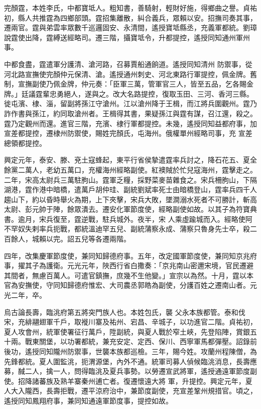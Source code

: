 \begin{pinyinscope}
 完顏霆，本姓李氏，中都寶坻人。粗知書，善騎射，輕財好施，得鄉曲之譽。貞祐初，縣人共推霆為四鄉部頭。霆招集離散，糾合義兵，眾賴以安。招撫司奏其事，遷兩官。霆與弟雲率眾數千巡邏固安、永清間，遙授寶坻縣丞，充義軍都統。劉璋說霆使出降，霆縛送經略司。遷三階，攝寶坻令，升都提控，遙授同知通州軍州事。



 中都食盡，霆遣軍分護清、滄河路，召募賈船通餉道。遙授同知清州
 防禦事，從河北路宣撫使完顏仲元保清、滄。遙授通州刺史、河北東路行軍提控，佩金牌。舊制，宣撫副使乃佩金牌，仲元奏：「臣軍三萬，管軍官三人，皆至五品，乞各賜金牌。」廷議霆輩忠勇絕人，遂與之。改大名路提控，復取玉田、三河、香河三縣。徙屯濱、棣、淄，留副將孫江守滄州。江以滄州降于王楫，而江將兵圍觀州。霆乃詐作書與孫江，約同取滄州者。王楫得其書，果疑孫江與霆有謀，召江還，殺之。霆乃定觀州而還。進官三階，充濱、棣行軍都提控。未幾，遙授同知益都府事，加宣差都提控，遷棣州防禦使，賜姓完顏氏，屯海州。俄權單州經略司事，充
 宣差總領都提控。



 興定元年，泰安、滕、兗土寇蜂起，東平行省侯摯遣霆率兵討之，降石花五、夏全餘黨二萬人，老幼五萬口，充權海州經略副使。紅襖賊於忙兒寇海州，霆擊走之。二年，宋高太尉兵三萬駐朐山。霆軍乏糧，採野菜麥苗雜食之。宋兵柵朐山，下隔湖港，霆作港中暗橋，遣萬戶胡仲珪、副統劉斌率死士由暗橋登山，霆率兵四千人趨山下，約以昏時舉火為期，上下夾擊，宋兵大敗，墜澗溺水死者不可勝計，斬高太尉、彭元帥于陣，餘眾潰去。遷安化軍節度使，經略副使如故。以其子為符寶典書。逾月，宋兵復至，霆逆戰，駐兵城外。夜半，宋
 人乘虛踰城而入。經略使阿不罕奴失剌率兵扼戰，都統溫迪罕五兒、副統蒲察永成、蒲察只魯身先士卒，殺二百餘人，城賴以完。詔五兒等各遷兩階。



 四年，改集慶軍節度使，兼同知歸德府事。五年，改定國軍節度使，兼同知京兆府事，擢其子為護衛。元光元年，陜西行省白撒奏：「京兆南山密邇宋境，官民遷避其間者，無慮百萬人。可遣官鎮撫，庶幾不生他變。」宣宗以為然。十月，霆以本官為安撫使，守同知歸德府惟宏、大司農丞郭皓為副使，分護百姓之遷南山者。元光二年，卒。



 烏古論長壽，臨洮府第五將突門族人也。本姓包氏，襲
 父永本族都管。泰和伐宋，充緋翮翅軍千戶，取褷川寨及祐州、宕昌、辛城子，以功進官二階。貞祐初，夏人攻會州，統軍使署征行萬戶，陞副統，與夏人戰於窄土峽，先登陷陣，賞銀五十兩。戰東關堡，以功署都統，兼充安定、定西、保川、西寧軍馬都彈壓。詔錄前後功，遙授同知隴州防禦事，世襲本族都巡檢。三年，賜今姓。攻蘭州程陳僧，為先鋒都統。夏人圍監洮，扼渭源堡，內外不通。統軍司募人偵候臨洮消息，長壽應募，馘二人，擒一人，問得臨洮及夏兵事勢。以勞遷宣武將軍，遙授通遠軍節度副使。招降諸蕃族及熟羊寨秦州逋亡者。復遷懷遠大將
 軍，升提控。興定元年，夏人大入隴西，長壽拒戰，遷平涼府治中，兼節度副使，充宣差鞏州規措官。頃之，遙授同知鳳翔府事，兼同知通遠軍節度事，提控如故。




\end{pinyinscope}
